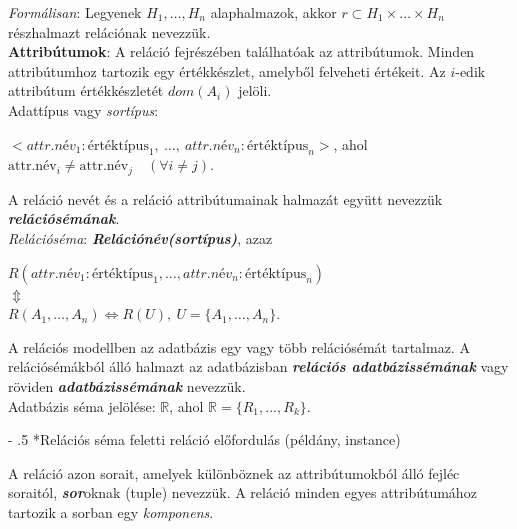 \documentclass[tikz,12pt,margin=0px]{article}
\makeatletter
\renewcommand\paragraph{%
	\@startsection{paragraph}{4}{0mm}%
	{-\baselineskip}%
	{.5\baselineskip}%
	{\normalfont\normalsize\bfseries}}
\makeatother
\begin{document}
    \noindent \emph{Formálisan}: Legyenek $H_{1}, \ldots, H_{n}$ alaphalmazok, akkor $r \subset H_{1} \times \ldots \times H_{n}$ részhalmazt relációnak nevezzük.\\

    \noindent \textbf{Attribútumok}: A reláció fejrészében találhatóak az attribútumok. Minden attribútumhoz tartozik egy értékkészlet, amelyből felveheti értékeit. Az $i$-edik attribútum értékkészletét $dom(A_i)$ jelöli.\\

    \noindent Adattípus vagy \emph{sortípus}:
    \begin{center}
        $\big<\textit{attr.név}_1 : \text{értéktípus}_1,\ \ldots,\ \textit{attr.név}_{n} : \text{értéktípus}_{n}\big>$, ahol $\text{attr.név}_{i} \boldsymbol{\neq} \text{attr.név}_{j}\quad (\forall i \neq j)$.\\
    \end{center}

    \noindent A reláció nevét és a reláció attribútumainak halmazát együtt nevezzük \emph{\textbf{relációsémának}}.\\
    \noindent \emph{Relációséma}: \textbf{\emph{Relációnév(sortípus)}}, azaz
    \begin{center}
        $R(\textit{attr.név}_1 : \text{értéktípus}_1, \ldots, \textit{attr.név}_{n} : \text{értéktípus}_{n})$\\
        $\Updownarrow$\\
        $R(A_{1}, \ldots, A_{n}) \Leftrightarrow R(U),\ U = \big\{A_{1}, \ldots, A_{n}\big\}$.
    \end{center}

    \noindent A relációs modellben az adatbázis egy vagy több relációsémát tartalmaz. A relációsémákból álló halmazt az adatbázisban \emph{\textbf{relációs adatbázissémának}} vagy röviden \emph{\textbf{adatbázissémának}} nevezzük.\\

    \noindent Adatbázis séma jelölése: $\mathds{R}$, ahol $\mathds{R} = \{R_1 , ... , R_k\}$.

\newpage
    \paragraph*{Relációs séma feletti reláció előfordulás (példány, instance)}

    A reláció azon sorait, amelyek különböznek az attribútumokból álló fejléc soraitól, \emph{\textbf{sor}}oknak (tuple) nevezzük. A reláció minden egyes attribútumához tartozik a sorban egy \emph{komponens}.\\
\end{document}
